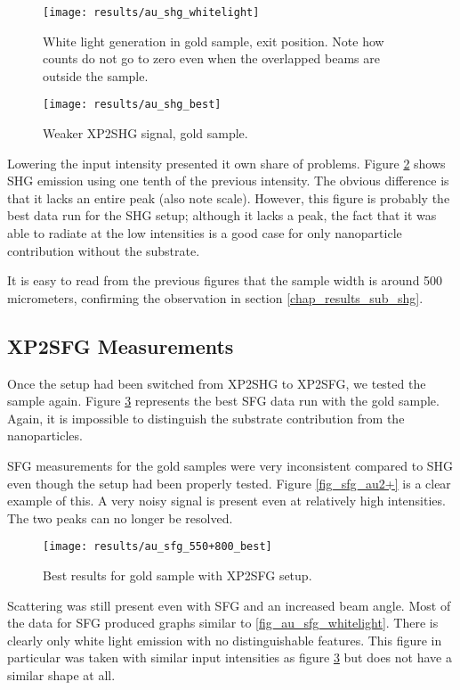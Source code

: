 \begin{figure}[h]
\centering
\texttt{[image: results/au\_shg\_whitelight]}
\caption[White light generation, gold sample.]{White light generation in gold sample, exit position. Note how counts do not go to zero even when the overlapped beams are outside the sample.\label{fig_au_shg_whitelight}}
\end{figure}

\begin{figure}[H]
\centering
\texttt{[image: results/au\_shg\_best]}
\caption{Weaker XP2SHG signal, gold sample.\label{fig_au_shg_best}}
\end{figure}

Lowering the input intensity presented it own share of problems. Figure \ref{fig_au_shg_best} shows SHG emission using one tenth of the previous intensity. The obvious difference is that it lacks an entire peak (also note scale). However, this figure is probably the best data run for the SHG setup; although it lacks a peak, the fact that it was able to radiate at the low intensities is a good case for only nanoparticle contribution without the substrate.

It is easy to read from the previous figures that the sample width is around 500 micrometers, confirming the observation in section \ref{chap_results_sub_shg}.

\subsection{XP2SFG Measurements}
Once the setup had been switched from XP2SHG to XP2SFG, we tested the sample again. Figure \ref{fig_au_sfg_best} represents the best SFG data run with the gold sample. Again, it is impossible to distinguish the substrate contribution from the nanoparticles.

SFG measurements for the gold samples were very inconsistent compared to SHG even though the setup had been properly tested. Figure \ref{fig_sfg_au2+} is a clear example of this. A very noisy signal is present even at relatively high intensities. The two peaks can no longer be resolved.

\begin{figure}[h]
\centering
\texttt{[image: results/au\_sfg\_550+800\_best]}
\caption{Best results for gold sample with XP2SFG setup.\label{fig_au_sfg_best}}
\end{figure}

Scattering was still present even with SFG and an increased beam angle. Most of the data for SFG produced graphs similar to \ref{fig_au_sfg_whitelight}. There is clearly only white light emission with no distinguishable features. This figure in particular was taken with similar input intensities as figure \ref{fig_au_sfg_best} but does not have a similar shape at all.

